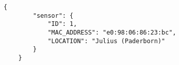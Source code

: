 \begin{figure}[bht]
    \begin{lstlisting}[caption=Antwort GET-Request /sensor/id/1, label=list:getSensor]
	{
		"sensor": {
			"ID": 1,
			"MAC_ADDRESS": "e0:98:06:86:23:bc",
			"LOCATION": "Julius (Paderborn)"
		}
	}
    \end{lstlisting}
\end{figure}
